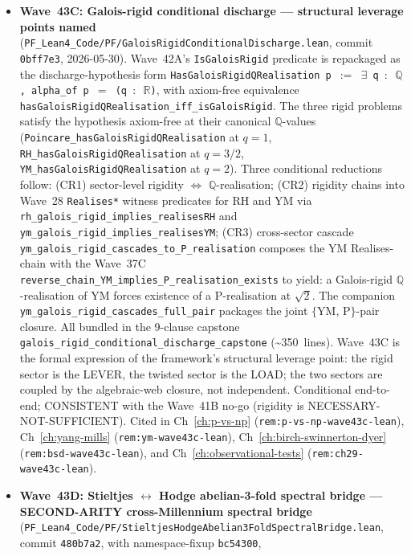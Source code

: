 \begin{itemize}
\item \textbf{Wave~43C: Galois-rigid conditional discharge ---
  structural leverage points named}
  (\texttt{PF\_Lean4\_Code/PF/GaloisRigidConditionalDischarge.lean},
  commit \texttt{0bff7e3}, 2026-05-30). Wave~42A's
  \texttt{IsGaloisRigid} predicate is repackaged as the
  discharge-hypothesis form
  \texttt{HasGaloisRigidQRealisation p $:=$ $\exists$ q $:$
  $\mathbb{Q}$, alpha\_of p $=$ (q $:$ $\mathbb{R}$)}, with
  axiom-free equivalence
  \texttt{hasGaloisRigidQRealisation\_iff\_isGaloisRigid}. The three
  rigid problems satisfy the hypothesis axiom-free at their canonical
  $\mathbb{Q}$-values (\texttt{Poincare\_hasGaloisRigidQRealisation}
  at $q = 1$, \texttt{RH\_hasGaloisRigidQRealisation} at $q = 3/2$,
  \texttt{YM\_hasGaloisRigidQRealisation} at $q = 2$). Three
  conditional reductions follow: (CR1) sector-level rigidity
  $\Leftrightarrow$ $\mathbb{Q}$-realisation; (CR2) rigidity chains
  into Wave~28 \texttt{Realises*} witness predicates for RH and YM
  via \texttt{rh\_galois\_rigid\_implies\_realisesRH} and
  \texttt{ym\_galois\_rigid\_implies\_realisesYM}; (CR3) cross-sector
  cascade \texttt{ym\_galois\_rigid\_cascades\_to\_P\_realisation}
  composes the YM Realises-chain with the Wave~37C
  \texttt{reverse\_chain\_YM\_implies\_P\_realisation\_exists} to
  yield: a Galois-rigid $\mathbb{Q}$-realisation of YM forces
  existence of a P-realisation at $\sqrt{2}$. The companion
  \texttt{ym\_galois\_rigid\_cascades\_full\_pair} packages the joint
  $\{$YM, P$\}$-pair closure. All bundled in the 9-clause capstone
  \texttt{galois\_rigid\_conditional\_discharge\_capstone}
  (\textasciitilde 350~lines). Wave~43C is the formal expression of
  the framework's structural leverage point: the rigid sector is the
  LEVER, the twisted sector is the LOAD; the two sectors are coupled
  by the algebraic-web closure, not independent. Conditional
  end-to-end; CONSISTENT with the Wave~41B no-go (rigidity is
  NECESSARY-NOT-SUFFICIENT). Cited in Ch~\ref{ch:p-vs-np}
  (\texttt{rem:p-vs-np-wave43c-lean}), Ch~\ref{ch:yang-mills}
  (\texttt{rem:ym-wave43c-lean}), Ch~\ref{ch:birch-swinnerton-dyer}
  (\texttt{rem:bsd-wave43c-lean}), and
  Ch~\ref{ch:observational-tests}
  (\texttt{rem:ch29-wave43c-lean}).
\item \textbf{Wave~43D: Stieltjes $\leftrightarrow$ Hodge
  abelian-3-fold spectral bridge --- SECOND-ARITY cross-Millennium
  spectral bridge}
  (\texttt{PF\_Lean4\_Code/PF/StieltjesHodgeAbelian3FoldSpectralBridge.lean},
  commit \texttt{480b7a2}, with namespace-fixup \texttt{bc54300},

\end{itemize}
